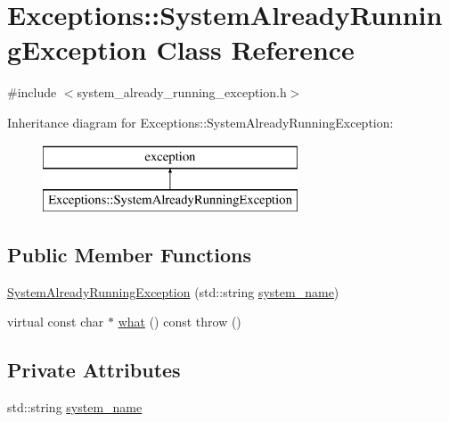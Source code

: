 \hypertarget{class_exceptions_1_1_system_already_running_exception}{}\section{Exceptions\+:\+:System\+Already\+Running\+Exception Class Reference}
\label{class_exceptions_1_1_system_already_running_exception}


{\ttfamily \#include $<$system\+\_\+already\+\_\+running\+\_\+exception.\+h$>$}

Inheritance diagram for Exceptions\+:\+:System\+Already\+Running\+Exception\+:\begin{figure}[H]
\begin{center}
\leavevmode
\includegraphics[height=2.000000cm]{class_exceptions_1_1_system_already_running_exception}
\end{center}
\end{figure}
\subsection*{Public Member Functions}
\begin{DoxyCompactItemize}
\item 
\hyperlink{class_exceptions_1_1_system_already_running_exception_aed8f9f444543924acea118e7485fdbba}{System\+Already\+Running\+Exception} (std\+::string \hyperlink{class_exceptions_1_1_system_already_running_exception_a914a5cb77c9acbd05862c8927da7ea36}{system\+\_\+name})
\item 
virtual const char $\ast$ \hyperlink{class_exceptions_1_1_system_already_running_exception_a558ddbeefc7c578b0a2c7ac031a5aef5}{what} () const   throw ()
\end{DoxyCompactItemize}
\subsection*{Private Attributes}
\begin{DoxyCompactItemize}
\item 
std\+::string \hyperlink{class_exceptions_1_1_system_already_running_exception_a914a5cb77c9acbd05862c8927da7ea36}{system\+\_\+name}
\end{DoxyCompactItemize}


